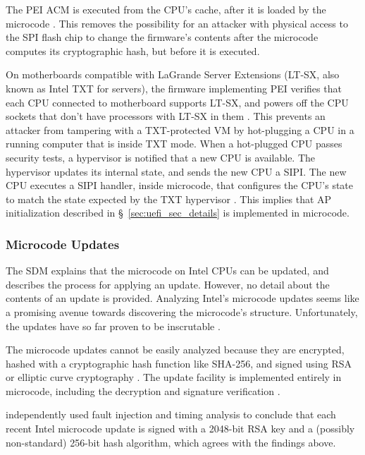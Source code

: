 The PEI ACM is executed from the CPU's cache, after it is loaded by the
microcode \cite{datta2010trustedboot, intel2012patching, datta2013acm}. This
removes the possibility for an attacker with physical access to the SPI flash
chip to change the firmware's contents after the microcode computes its
cryptographic hash, but before it is executed.


On motherboards compatible with LaGrande Server Extensions (LT-SX, also known
as Intel TXT for servers), the firmware implementing PEI verifies that each CPU
connected to motherboard supports LT-SX, and powers off the CPU sockets that
don't have processors with LT-SX in them \cite{intel2012ltsx}. This prevents an
attacker from tampering with a TXT-protected VM by hot-plugging a CPU in a
running computer that is inside TXT mode. When a hot-plugged CPU passes
security tests, a hypervisor is notified that a new CPU is available. The
hypervisor updates its internal state, and sends the new CPU a SIPI. The new
CPU executes a SIPI handler, inside microcode, that configures the CPU's state
to match the state expected by the TXT hypervisor \cite{intel2012ltsx}. This
implies that AP initialization described in \S~\ref{sec:uefi_sec_details} is
implemented in microcode.


\subsubsection{Microcode Updates}
\label{microcode:updates}

The SDM explains that the microcode on Intel CPUs can be updated, and describes
the process for applying an update. However, no detail about the contents of an
update is provided. Analyzing Intel's microcode updates seems like a promising
avenue towards discovering the microcode's structure. Unfortunately, the
updates have so far proven to be inscrutable \cite{chen2014microcode}.


The microcode updates cannot be easily analyzed because they are encrypted,
hashed with a cryptographic hash function like SHA-256, and signed using RSA or
elliptic curve cryptography \cite{intel2012patching}. The update facility is
implemented entirely in microcode, including the decryption and signature
verification \cite{intel2012patching}.

\cite{hawkes2012microcode} independently used fault injection and timing
analysis to conclude that each recent Intel microcode update is signed with a
2048-bit RSA key and a (possibly non-standard) 256-bit hash algorithm, which
agrees with the findings above.

